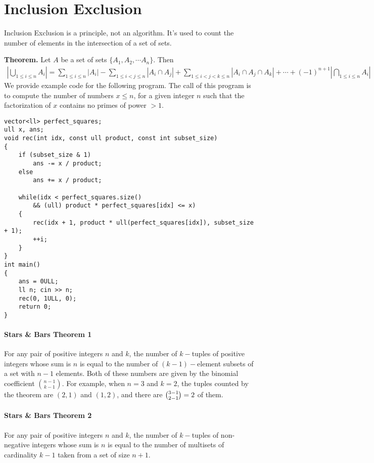 \documentclass[12pt]{book}
\begin{document}
\section{Inclusion Exclusion}
Inclusion Exclusion is a principle, not an algorithm. It's used to count the number of elements in the intersection of a set of sets.

\textbf{Theorem. }Let $A$ be a set of sets $\{A_1, A_2, \cdots A_n\}$. Then
\begin{align*}
|\bigcup\limits_{1 \leq i \leq n} A_i| = \sum\limits_{1 \leq i \leq n} |A_i| - \sum\limits_{1 \leq i < j\leq n}|A_i \cap A_j| + \sum\limits_{1 \leq i < j < k \leq n}|A_i \cap A_j \cap A_k| + \cdots + (-1)^{n + 1}|\bigcap\limits_{1 \leq i \leq n} A_i|
\end{align*}
We provide example code for the following program. The call of this program is to compute the number of numbers $x \leq n$, for a given integer $n$ such that the factorization of $x$ contains no primes of power $> 1$.
\begin{verbatim}
vector<ll> perfect_squares;
ull x, ans;
void rec(int idx, const ull product, const int subset_size)
{
	if (subset_size & 1)
		ans -= x / product;
	else
		ans += x / product;
	
	while(idx < perfect_squares.size()
		&& (ull) product * perfect_squares[idx] <= x)
	{
		rec(idx + 1, product * ull(perfect_squares[idx]), subset_size + 1);
		++i;
	}
}
int main()
{
	ans = 0ULL;
	ll n; cin >> n;
	rec(0, 1ULL, 0);
	return 0;
}
\end{verbatim}
\paragraph{Stars \& Bars Theorem 1}
For any pair of positive integers $n$ and $k$, the number of $k-$tuples of positive integers whose sum is $n$ is equal to the number of $(k-1)-$element subsets of a set with $n-1$ elements.
Both of these numbers are given by the binomial coefficient ${n-1 \choose k-1}$. For example, when $n = 3$ and $k = 2$, the tuples counted by the theorem are $(2, 1)$ and $(1, 2)$, and there are $\tbinom {3-1}{2-1} = 2$ of them.

\paragraph{Stars \& Bars Theorem 2}
For any pair of positive integers $n$ and $k$, the number of $k-$tuples of non-negative integers whose sum is $n$ is equal to the number of multisets of cardinality $k-1$ taken from a set of size $n + 1$.
\end{document}

